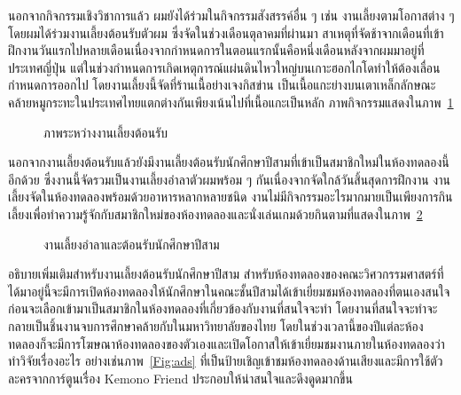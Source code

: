นอกจากกิจกรรมเชิงวิชาการแล้ว ผมยังได้ร่วมในกิจกรรมสังสรรค์อื่น ๆ เช่น งานเลี้ยงตามโอกาสต่าง ๆ โดยผมได้ร่วมงานเลี้ยงต้อนรับตัวผม ซึ่งจัดในช่วงเดือนตุลาคมที่ผ่านมา สาเหตุที่จัดช้าจากเดือนที่เข้าฝึกงานวันแรกไปหลายเดือนเนื่องจากกำหนดการในตอนแรกนั้นคือหนึ่งเดือนหลังจากผมมาอยู่ที่ประเทศญี่ปุ่น แต่ในช่วงกำหนดการเกิดเหตุการณ์แผ่นดินไหวใหญ่บนเกาะฮอกไกโดทำให้ต้องเลื่อนกำหนดการออกไป โดยงานเลี้ยงนี้จัดที่ร้านเนื้อย่างเจงกิสข่าน เป็นเนื้อแกะย่างบนเตาเหล็กลักษณะคล้ายหมูกระทะในประเทศไทยแตกต่างกันเพียงเน้นไปที่เนื้อแกะเป็นหลัก ภาพกิจกรรมแสดงในภาพ~\ref{Fig:welcome-party}

\begin{figure}[!h]
    \centering
    \caption{ภาพระหว่างงานเลี้ยงต้อนรับ}
    \label{Fig:welcome-party}
\end{figure}

นอกจากงานเลี้ยงต้อนรับแล้วยังมีงานเลี้ยงต้อนรับนักศึกษาปีสามที่เข้าเป็นสมาชิกใหม่ในห้องทดลองนี้อีกด้วย ซึ่งงานนี้จัดรวมเป็นงานเลี้ยงอำลาตัวผมพร้อม ๆ กันเนื่องจากจัดใกล้วันสิ้นสุดการฝึกงาน งานเลี้ยงจัดในห้องทดลองพร้อมด้วยอาหารหลากหลายชนิด งานไม่มีกิจกรรมอะไรมากมายเป็นเพียงการกินเลี้ยงเพื่อทำความรู้จักกับสมาชิกใหม่ของห้องทดลองและนั่งเล่นเกมด้วยกินตามที่แสดงในภาพ~\ref{Fig:farewell-party}

\begin{figure}[!h]
    \centering
    \caption{งานเลี้ยงอำลาและต้อนรับนักศึกษาปีสาม}
    \label{Fig:farewell-party}
\end{figure}

อธิบายเพิ่มเติมสำหรับงานเลี้ยงต้อนรับนักศึกษาปีสาม สำหรับห้องทดลองของคณะวิศวกรรมศาสตร์ที่ได้มาอยู่นี้จะมีการเปิดห้องทดลองให้นักศึกษาในคณะชั้นปีสามได้เข้าเยี่ยมชมห้องทดลองที่ตนเองสนใจก่อนจะเลือกเข้ามาเป็นสมาชิกในห้องทดลองที่เกี่ยวข้องกับงานที่สนใจจะทำ โดยงานที่สนใจจะทำจะกลายเป็นชิ้นงานจบการศึกษาคล้ายกับในมหาวิทยาลัยของไทย โดยในช่วงเวลานี้ของปีแต่ละห้องทดลองก็จะมีการโฆษณาห้องทดลองของตัวเองและเปิดโอกาสให้เข้าเยี่ยมชมงานภายในห้องทดลองว่าทำวิจัยเรื่องอะไร อย่างเช่นภาพ~\ref{Fig:ads} ที่เป็นป้ายเชิญเข้าชมห้องทดลองด้านเสียงและมีการใช้ตัวละครจากการ์ตูนเรื่อง Kemono Friend ประกอบให้น่าสนใจและดึงดูดมากขึ้น

